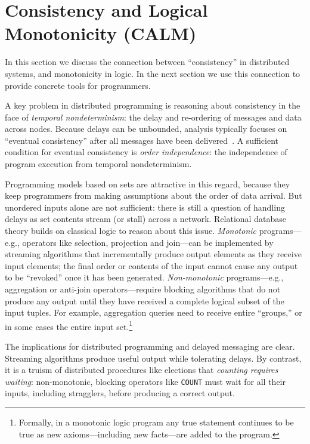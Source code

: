 \section{Consistency and Logical Monotonicity (CALM)}
In this section we discuss the connection between ``consistency'' in distributed systems, and monotonicity in logic.  In the next section we use this connection to provide concrete tools for programmers.

A key problem in distributed programming is reasoning about consistency in the face of {\em
temporal nondeterminism}: the delay and re-ordering of messages and data across
nodes.  Because delays can be unbounded, analysis typically focuses on ``eventual consistency'' after all messages have been delivered~\cite{vogels}.  A sufficient condition for eventual consistency is {\em order independence}: the independence of program execution from temporal
nondeterminism.

Programming models based on sets are attractive in this regard, because they keep programmers from making assumptions about the order of data arrival.   But unordered inputs alone are not sufficient: there is still a question of handling delays as set contents stream (or stall) across a network. Relational database theory builds on classical logic to reason about this issue. \emph{Monotonic} programs---e.g., operators like selection, projection and join---can be implemented by streaming algorithms that incrementally produce output elements as they receive input elements; the final order or contents of the input cannot cause any output to be ``revoked'' once it has been generated.  
\emph{Non-monotonic} programs---e.g., aggregation or anti-join operators---require blocking algorithms that do not produce any output until they have received a complete logical subset of the input tuples.  For example, aggregation queries need to receive entire ``groups,'' or in some cases the entire input set.\footnote{Formally, in a monotonic logic program any true statement continues to be true as new axioms---including new facts---are added to the program.}  

The implications for distributed programming and delayed messaging are clear. Streaming algorithms produce useful output while tolerating delays.  By contrast, it is a truism of distributed procedures like elections that \emph{counting requires waiting}: non-monotonic, blocking operators like \texttt{COUNT} must wait for all their inputs, including stragglers, before producing a correct output.


